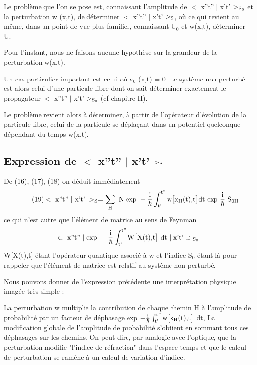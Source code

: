 Le problème que l'on se pose est, connaissant l'amplitude de
$<$ x''t'' $|$ x't' $>_{\text{S}_0}$
et la perturbation w (x,t), de déterminer $<$ x''t'' $|$ x't' $>_{\text{S}}$, où
ce qui revient au même, dans un point de vue plus familier, connaissant
U$_0$
et w(x,t), déterminer U.

Pour l'instant, nous ne faisons aucune hypothèse sur la
grandeur de la perturbation w(x,t).

Un cas particulier important est celui où v$_0$ (x,t) = 0.
Le système non perturbé est alors celui d'une particule libre dont on sait
déterminer exactement le propagateur $<$ x''t'' $|$ x't' $>_{\text{S}_0}$ (cf chapitre II).

Le problème revient alors à déterminer, à partir de l'opérateur d'évolution
de la particule libre, celui de la particule se déplaçant dans un potentiel
quelconque dépendant du temps w(x,t).

\subsection{Expression de $<$ x''t'' $|$ x't' $>_{\text{S}}$}%

De (16), (17), (18) on déduit immédiatement
\[
\tag{19} <\text{ x''t'' }|\text{ x't' }>_{\text{S}}=\sum_{\text{H}}\text{ N exp }-\frac{\text{i}}{\hbar}\int_{\text{t'}}^{\text{t''}}\text{w}\big[\text{x}_{\text{H}}(\text{t})\text{,t}\big]\text{dt exp }\frac{\text{i}}{\hbar} \text{ S}_{\text{0H}}
\]
ce qui n'est autre que l'élément de matrice au sens de Feynman
\[
\subset \text{ x''t'' }|\text{ exp }-\frac{\text{i}}{\hbar}\int_{\text{t'}}^{\text{t''}}\text{W}\big[\text{X}(\text{t})\text{,t}\big]\text{ dt }|\text{ x't'}\supset_{\text{ S}_0}
\]
W$\big[$X(t),t$\big]$ étant l'opérateur quantique associé à w et l'indice S$_0$ étant là
pour rappeler que l'élément de matrice est relatif au système non perturbé.

Nous pouvons donner de l'expression précédente une interprétation physique imagée très simple :

La perturbation w multiplie la contribution de chaque chemin H à l'amplitude
de probabilité par un facteur de déphasage exp $-\frac{\text{i}}{\hbar}\int_{\text{t'}}^{\text{t''}}\text{w}\big[\text{x}_{\text{H}}(\text{t})\text{,t}\big]$ dt, La
modification globale de l'amplitude de probabilité s'obtient en sommant
tous ces déphasages sur les chemins. On peut dire, par analogie avec l'optique,
que la perturbation modifie "l'indice de réfraction" dans l'espace-temps et
que le calcul de perturbation se ramène à un calcul de variation d'indice.

